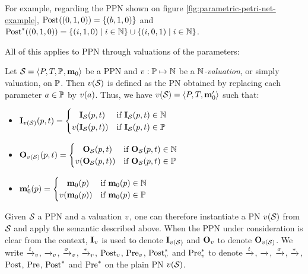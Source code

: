 For example, regarding the \ac{PPN} shown on figure \ref{fig:parametric-petri-net-example},
$\operatorname{Post}_{}(\left(0,1,0\right)) = \{\left(b, 1, 0\right)\}$
and
$\operatorname{Post}^*_{{}}(\left(0,1,0\right)) = \left\{\left(i, 1, 0\right) \mid i \in \mathbb{N}\right\} \cup \left\{\left(i, 0, 1\right) \mid i \in \mathbb{N}\right\}$.

All of this applies to \ac{PPN} through valuations of the parameters:
\begin{defi}
  Let $\defPPN$ be a \ac{PPN} and $\val : \parameters \mapsto \naturals$ be a \emph{$\mathbb{N}$-valuation}, or simply valuation, on $\mathbb{P}$.
  Then $\val[\namePPN]$ is defined as the \ac{PN} obtained by replacing each parameter $\param \in \parameters$ by $\val[\param]$.
  Thus, we have $\val[\namePPN] = \tuple{\places, \transitions, \mari'}$ such that:
  \begin{itemize}
    \item $\inm[\val(\namePPN)][p, t] =
      \begin{cases}
        \phantom{\val(}\inm[\namePPN][p, t]  & \text{if } \inm[\namePPN][p, t] \in \naturals \\
                 \val( \inm[\namePPN][p, t]) & \text{if } \inm[\namePPN][p, t] \in \parameters
      \end{cases}$
    \item $\outm[\val(\namePPN)][p, t] =
      \begin{cases}
        \phantom{\val(}\outm[\namePPN][p, t]  & \text{if } \outm[\namePPN][p, t] \in \naturals \\
                 \val( \outm[\namePPN][p, t]) & \text{if } \outm[\namePPN][p, t] \in \parameters
      \end{cases}$
    \item $\mari'(p) =
      \begin{cases}
        \phantom{\val(}\mari(p)  & \text{if } \mari(p) \in \naturals \\
                 \val( \mari(p)) & \text{if } \mari(p) \in \parameters
      \end{cases}$
  \end{itemize}
\end{defi}

Given $\mathcal{S}_{{}}$ a \ac{PPN} and a valuation $\val$, one can therefore instantiate a \ac{PN} $\val[\namePPN]$ from $\mathcal{S}_{{}}$ and apply the semantic described above.
When the \ac{PPN} under consideration is clear from the context, $\inm[\val]$ is used to denote $\inm[\val(\namePPN)]$ and $\outm[\val]$ to denote $\outm[\val(\namePPN)]$.
We write $\fire[\val]{t}$,
         $\fire[\val]{}$,
         $\fire[\val]{\sigma}$,
         $\fire[\val]{*}$,
         $\operatorname{Post}_v$,
         $\operatorname{Pre}_v$,
         $\operatorname{Post}^*_v$
     and $\operatorname{Pre}^*_v$
to denote $\xrightarrow{t}_{}$,
          $\xrightarrow{}_{}$,
          $\xrightarrow{\sigma}_{}$,
          $\xrightarrow{*}_{}$,
          $\operatorname{Post}$,
          $\operatorname{Pre}$,
          $\operatorname{Post}^*$
      and $\operatorname{Pre}^*$
on the plain \ac{PN} $\val(\namePPN)$.

